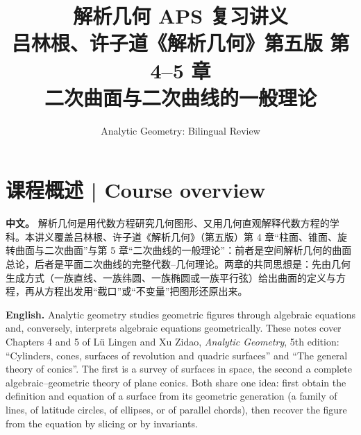 \documentclass[UTF8,11pt,a4paper]{ctexart}
\title{解析几何 APS 复习讲义\\[4pt]\large 吕林根、许子道《解析几何》第五版 第 4--5 章\\[2pt]\normalsize 二次曲面与二次曲线的一般理论}
\author{Analytic Geometry: Bilingual Review}
\date{}
\newcommand{\APS}[2]{\par\noindent\textbf{中文。} #1\par\noindent\textbf{English.} #2\par\smallskip}
\theoremstyle{definition}
\begin{document}
\maketitle

\section*{课程概述 | Course overview}
\APS{解析几何是用代数方程研究几何图形、又用几何直观解释代数方程的学科。本讲义覆盖吕林根、许子道《解析几何》（第五版）第 4 章``柱面、锥面、旋转曲面与二次曲面''与第 5 章``二次曲线的一般理论''：前者是空间解析几何的曲面总论，后者是平面二次曲线的完整代数--几何理论。两章的共同思想是：先由几何生成方式（一族直线、一族纬圆、一族椭圆或一族平行弦）给出曲面的定义与方程，再从方程出发用``截口''或``不变量''把图形还原出来。}{Analytic geometry studies geometric figures through algebraic equations and, conversely, interprets algebraic equations geometrically. These notes cover Chapters 4 and 5 of Lü Lingen and Xu Zidao, \emph{Analytic Geometry}, 5th edition: ``Cylinders, cones, surfaces of revolution and quadric surfaces'' and ``The general theory of conics''. The first is a survey of surfaces in space, the second a complete algebraic--geometric theory of plane conics. Both share one idea: first obtain the definition and equation of a surface from its geometric generation (a family of lines, of latitude circles, of ellipses, or of parallel chords), then recover the figure from the equation by slicing or by invariants.}
\end{document}
